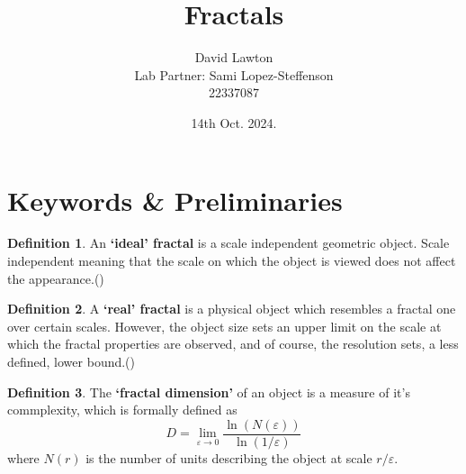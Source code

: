 \documentclass{article}
\title{Fractals}
\author{David Lawton\\
        Lab Partner: Sami Lopez-Steffenson\\
        22337087}
\date{14th Oct. 2024.}
\theoremstyle{definition}
\newtheorem{definition}{Definition}[section]
\theoremstyle{remark}
\begin{document}
\maketitle

\tableofcontents
{}
\begin{abstract}
        
\end{abstract}

\section{Keywords \& Preliminaries}\label{sec:keywords}
\begin{definition}
        An \textbf{`ideal' fractal} is a scale independent geometric object. Scale independent meaning that the scale on which the object is viewed does not affect the appearance.(\cite{LabHandbook})
\end{definition}
\begin{definition}
        A \textbf{`real' fractal} is a physical object which resembles a fractal one over certain scales. However, the object size sets an upper limit on the scale at which the fractal properties are observed, and of course, the resolution sets, a less defined, lower bound.(\cite{LabHandbook})
\end{definition}
\begin{definition}
        The \textbf{`fractal dimension'} of an object is a measure of it's commplexity, which is formally defined as
\begin{equation}
        \label{eq:fractal_dimension}
        D = \lim_{\varepsilon \to 0} \frac{\ln(N(\varepsilon))}{\ln(1/\varepsilon)}
\end{equation}
        where $N(r)$ is the number of units describing the object at scale $r/\varepsilon$.
\end{definition}
\end{document}
